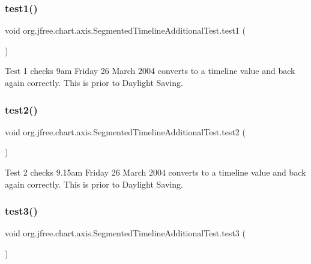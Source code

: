 \subsubsection{\texorpdfstring{test1()}{test1()}}
{\footnotesize\ttfamily void org.\+jfree.\+chart.\+axis.\+Segmented\+Timeline\+Additional\+Test.\+test1 (\begin{DoxyParamCaption}{ }\end{DoxyParamCaption})}

Test 1 checks 9am Friday 26 March 2004 converts to a timeline value and back again correctly. This is prior to Daylight Saving. \mbox{\label{classorg_1_1jfree_1_1chart_1_1axis_1_1_segmented_timeline_additional_test_aa761c9389ebf38be848a8963352669f3}} 
\subsubsection{\texorpdfstring{test2()}{test2()}}
{\footnotesize\ttfamily void org.\+jfree.\+chart.\+axis.\+Segmented\+Timeline\+Additional\+Test.\+test2 (\begin{DoxyParamCaption}{ }\end{DoxyParamCaption})}

Test 2 checks 9.\+15am Friday 26 March 2004 converts to a timeline value and back again correctly. This is prior to Daylight Saving. \mbox{\label{classorg_1_1jfree_1_1chart_1_1axis_1_1_segmented_timeline_additional_test_aab9c46eee14401b8d7dcf5166c95b988}} 
\subsubsection{\texorpdfstring{test3()}{test3()}}
{\footnotesize\ttfamily void org.\+jfree.\+chart.\+axis.\+Segmented\+Timeline\+Additional\+Test.\+test3 (\begin{DoxyParamCaption}{ }\end{DoxyParamCaption})}

